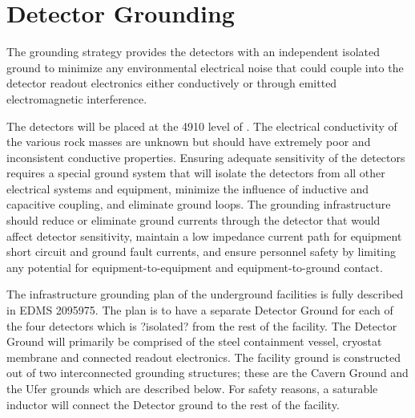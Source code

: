 \section{Detector Grounding}
\label{sec:fdsp-coord-faci-grounding}


The grounding strategy provides the detectors with an independent
isolated ground to minimize any environmental electrical noise that
could couple into the detector readout electronics either conductively or
through emitted electromagnetic interference.

The detectors will be placed at the 4910 level of \surf. The
electrical conductivity of the various rock masses are unknown but
should have extremely poor and inconsistent conductive
properties. Ensuring adequate sensitivity of the detectors requires a
special ground system that will isolate the detectors from all other
electrical systems and equipment, minimize the influence of inductive
and capacitive coupling, and eliminate ground loops. The grounding
infrastructure should reduce or eliminate ground currents through the
detector that would affect detector sensitivity, maintain a low
impedance current path for equipment short circuit and ground fault
currents, and ensure personnel safety by limiting any potential for
equipment-to-equipment and equipment-to-ground contact.

The infrastructure grounding plan of the underground facilities is fully described in EDMS 2095975.  The plan is to have a separate Detector Ground for each of the four detectors which is ?isolated? from the rest of the facility.  The Detector Ground will primarily be comprised of the steel containment vessel, cryostat membrane and connected readout electronics.  The facility ground is constructed out of two interconnected grounding structures; these are the Cavern Ground and the Ufer grounds which are described below.  For safety reasons, a saturable inductor will connect the Detector ground to the rest of the facility. 

